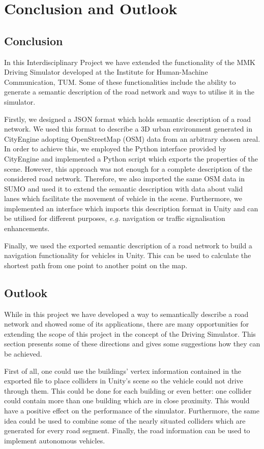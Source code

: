 \chapter{Conclusion and Outlook}
\label{ch:conclusion}

\section{Conclusion}
In this Interdisciplinary Project we have extended the functionality of the MMK Driving Simulator developed at the Institute for Human-Machine Communication, TUM. Some of these functionalities include the ability to generate a semantic description of the road network and ways to utilise it in the simulator.

Firstly, we designed a JSON format which holds semantic description of a road network. We used this format to describe a 3D urban environment generated in CityEngine adopting OpenStreetMap (OSM) data from an arbitrary chosen areal. In order to achieve this, we employed the Python interface provided by CityEngine and implemented a Python script which exports the properties of the scene. However, this approach was not enough for a complete description of the considered road network. Therefore, we also imported the same OSM data in SUMO and used it to extend the semantic description with data about valid lanes which facilitate the movement of vehicle in the scene. Furthermore, we implemented an interface which imports this description format in Unity and can be utilised for different purposes, \emph{e.g.} navigation or traffic signalisation enhancements. 

Finally, we used the exported semantic description of a road network to build a navigation functionality for vehicles in Unity. This can be used to calculate the shortest path from one point to another point on the map.

\section{Outlook}

While in this project we have developed a way to semantically describe a road network and showed some of its applications, there are many opportunities for extending the scope of this project in the concept of the Driving Simulator. This section presents some of these directions and gives some suggestions how they can be achieved. 

First of all, one could use the buildings' vertex information contained in the exported file to place colliders in Unity's scene so the vehicle could not drive through them. This could be done for each building or even better: one collider could contain more than one building which are in close proximity. This would have a positive effect on the performance of the simulator. Furthermore, the same idea could be used to combine some of the nearly situated colliders which are generated for every road segment. Finally, the road information can be used to implement autonomous vehicles. 
